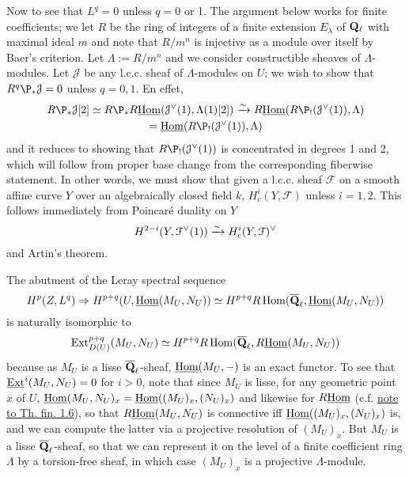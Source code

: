 \documentclass[deligne.tex]{subfiles}
\begin{document}
Now to see that $L^q=0$ unless $q=0$ or 1. The argument below works for 
finite coefficients; we let $R$ be the ring of integers of a finite extension
$E_\lambda$ of $\mathbf{Q}_\ell$ with maximal ideal $m$ and note that $R/m^n$ is
injective as a module over itself by Baer's criterion. Let $\Lambda:=R/m^n$
and we consider constructible sheaves of $\Lambda$-modules.
Let $\mathcal J$ be any l.c.c. sheaf of $\Lambda$-modules on $U$; we wish to 
show that $R^q\P_*\mathcal J=0$ unless $q=0,1$. En effet,
\begin{multline*}
	R\P_*\mathcal J[2]\simeq
	R\P_*R\underline\Hom(\mathcal J^\vee(1),\Lambda(1)[2])\xra\sim
	R\underline\Hom(R\P_!(\mathcal J^\vee(1)),\Lambda) \\
	=\underline\Hom(R\P_!(\mathcal J^\vee(1)),\Lambda)
\end{multline*}
and it reduces to showing that $R\P_!(\mathcal J^\vee(1))$ is concentrated in
degrees 1 and 2, which will follow from proper base change from the 
corresponding fiberwise statement. In other words, we must show that given a 
l.c.c. sheaf $\mathcal F$ on a smooth affine curve $Y$ over an algebraically 
closed field $k$, $H_c^i(Y,\mathcal F)$ unless $i=1,2$. This follows
immediately from Poincaré duality on $Y$
\begin{equation*}
	H^{2-i}(Y,\mathcal F^\vee(1))\xrightarrow\sim H^i_c(Y,\mathcal F)^\vee
\end{equation*}
and Artin's theorem.

The abutment of the Leray spectral sequence
\begin{equation*}
	H^p(Z,L^q)\Rightarrow H^{p+q}(U,\underline{\operatorname{Hom}}(M_U,N_U))
	\simeq H^{p+q}R\operatorname{Hom}(\overline{\mathbf{Q}}_\ell,\underline{\operatorname{Hom}}(M_U,N_U))
\end{equation*}
is naturally isomorphic to
\begin{equation*}
	\operatorname{Ext}_{D(U)}^{p+q}(M_U,N_U)\simeq H^{p+q}	R\operatorname{Hom}(\overline{\mathbf{Q}}_\ell,R\underline{\operatorname{Hom}}(M_U,N_U))
\end{equation*}
because as $M_U$ is a lisse $\overline{\mathbf{Q}}_\ell$-sheaf,
$\underline{\operatorname{Hom}}(M_U,-)$ is an exact functor.
To see that
$\underline{\operatorname{Ext}}^i(M_U,N_U)=0$ for $i>0$, note that since $M_U$ is 
lisse, for any geometric point $x$ of $U$,
$\underline{\operatorname{Hom}}(M_U,N_U)_x=\underline{\operatorname{Hom}}((M_U)_x,(N_U)_x)$ and likewise for
$R\underline{\operatorname{Hom}}$ (c.f. \hyperref[thfin:1.6]{note to Th. fin. 1.6}), so
that $R\underline{\operatorname{Hom}}(M_U,N_U)$ is connective iff
$\underline{\operatorname{Hom}}((M_U)_x,(N_U)_x)$ is, and we can compute the latter via a
projective resolution of $(M_U)_x$. But $M_U$ is a lisse
$\overline{\mathbf{Q}}_\ell$-sheaf, so that we can represent it on the level of a
finite coefficient ring $\Lambda$ by a torsion-free sheaf, in which case
$(M_U)_x$ is a projective $\Lambda$-module.
\end{document}
